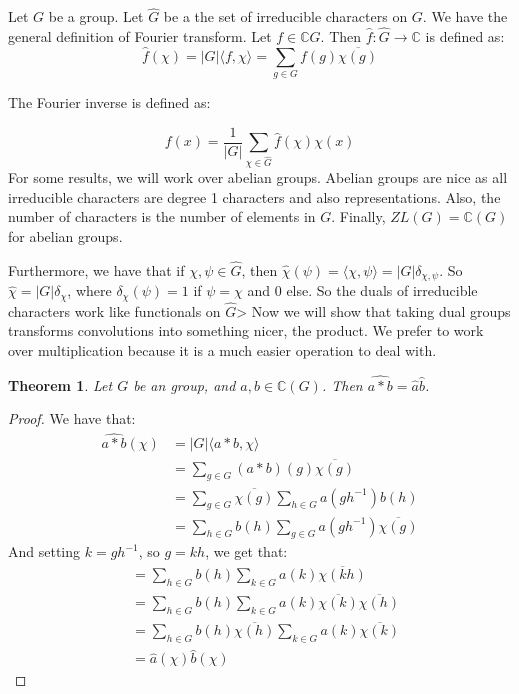 \documentclass[]{article}
\newtheorem{theorem}{Theorem}
\theoremstyle{definition}
\numberwithin{theorem}{section}
\numberwithin{equation}{section}
\begin{document}
Let $G$ be a group. Let $\hat{G}$ be a the set of irreducible characters on $G$.
We have the general definition of Fourier transform. Let $f \in \mathbb{C}G$. Then $\widehat{f}: \widehat{G} \rightarrow \mathbb{C}$ is defined as:
\begin{equation}
	\widehat{f}(\chi) = |G| \langle f, \chi \rangle = \sum_{g \in G} f(g) \overline{\chi(g)}
\end{equation}

The Fourier inverse is defined as:

\begin{equation}
	f(x) = \frac{1}{|G|} \sum_{\chi \in \widehat{G}} \widehat{f}(\chi) \chi(x)
\end{equation}
For some results, we will work over abelian groups. 
Abelian groups are nice as all irreducible characters are degree 1 characters and also representations. Also, the number of characters is the number of elements in $G$. Finally, $ZL(G) = \mathbb{C}(G)$ for abelian groups. 

Furthermore, we have that if $\chi, \psi \in \widehat{G}$, then $\widehat{\chi}(\psi) = \langle \chi, \psi \rangle = |G|\delta_{\chi, \psi}$. So $\widehat{\chi} = |G| \delta_{\chi}$, where $\delta_{\chi}(\psi) = 1$ if $\psi = \chi$ and 0 else. 
So the duals of irreducible characters work like functionals on $\widehat{G}$> 
Now we will show that taking dual groups transforms convolutions into something nicer, the product. We prefer to work over multiplication because it is a much easier operation to deal with. 

\begin{theorem}
	\label{thm:abelian dual commutation}
	Let $G$ be an group, and $a, b \in \mathbb{C}(G)$. Then $ \widehat{a \ast b} = \widehat{a} \widehat{b}$. 
\end{theorem}

\begin{proof}
	We have that:
	\begin{align*}
		\widehat{a \ast b}(\chi) &= |G| \langle a \ast b, \chi \rangle\\
		&= \sum_{g \in G} (a \ast b) (g) \overline{\chi(g)} \\
		&= \sum_{g \in G} \overline{\chi(g)} 
		\sum_{h \in G} a(g h^{-1}) b(h) \\
		&= \sum_{h \in G} b(h)  
		\sum_{g \in G} a(g h^{-1})\overline{\chi(g)}  
	\end{align*} 
	And setting $k = gh^{-1}$, so $g =kh$, we get that:
	\begin{align*}
		&= \sum_{h \in G} b(h)  
		\sum_{k \in G} a(k)\overline{\chi(kh)} \\
		&= \sum_{h \in G} b(h)  
		\sum_{k \in G} a(k)\overline{\chi(k)} \overline{\chi(h)} \\
		&=  \sum_{h \in G} b(h)  \overline{\chi(h)} 
		\sum_{k \in G} a(k)\overline{\chi(k)}\\
		&= \widehat{a}(\chi) \widehat{b}(\chi)
	\end{align*}
\end{proof}
\end{document}
